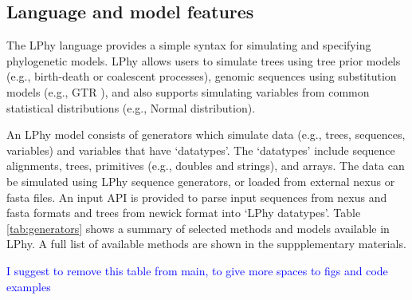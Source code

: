 \documentclass[10pt,letterpaper,table]{article}
\begin{document}
\subsection{Language and model features}
The LPhy language provides a simple syntax for simulating and specifying phylogenetic models.
LPhy allows users to simulate trees using tree prior models (e.g., birth-death or coalescent processes), genomic sequences using substitution models (e.g., GTR \cite{gtr}), and also supports simulating variables from common statistical distributions (e.g., Normal distribution). 

An LPhy model consists of generators which simulate data (e.g., trees, sequences, variables) and variables that have `datatypes'. 
The `datatypes' include sequence alignments, trees, primitives (e.g., doubles and strings), and arrays. 
The data can be simulated using LPhy sequence generators, or loaded from external nexus or fasta files. 
An input API is provided to parse input sequences from nexus and fasta formats and trees from newick format into `LPhy datatypes'. 
Table \ref{tab:generators} shows a summary of selected methods and models available in LPhy. 
A full list of available methods are shown in the suppplementary materials.

\textcolor{blue}{I suggest to remove this table from main, to give more spaces to figs and code examples}
\end{document}
